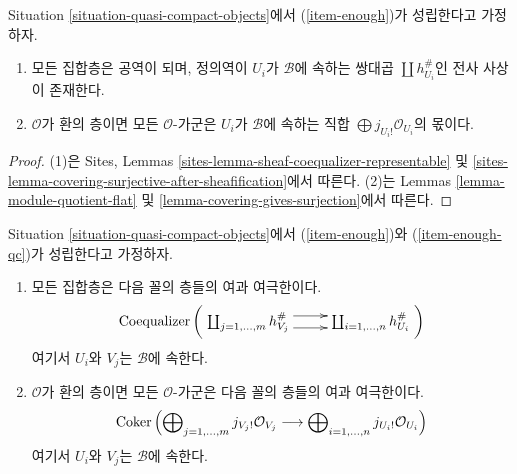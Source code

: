 \begin{lemma}
\label{lemma-module-quotient-direct-sum}
Situation \ref{situation-quasi-compact-objects}에서
(\ref{item-enough})가 성립한다고 가정하자.
\begin{enumerate}
\item 모든 집합층은 공역이 되며, 정의역이 $U_i$가 $\mathcal{B}$에 속하는
쌍대곱 $\coprod h_{U_i}^\#$인 전사 사상이 존재한다.
\item $\mathcal{O}$가 환의 층이면 모든 $\mathcal{O}$-가군은 $U_i$가
$\mathcal{B}$에 속하는 직합 $\bigoplus\nolimits j_{U_i!}\mathcal{O}_{U_i}$의
몫이다.
\end{enumerate}
\end{lemma}

\begin{proof}
(1)은 Sites, Lemmas
\ref{sites-lemma-sheaf-coequalizer-representable} 및
\ref{sites-lemma-covering-surjective-after-sheafification}에서 따른다.
(2)는 Lemmas \ref{lemma-module-quotient-flat} 및
\ref{lemma-covering-gives-surjection}에서 따른다.
\end{proof}

\begin{lemma}
\label{lemma-module-filtered-colimit-constructibles}
Situation \ref{situation-quasi-compact-objects}에서
(\ref{item-enough})와 (\ref{item-enough-qc})가 성립한다고 가정하자.
\begin{enumerate}
\item 모든 집합층은 다음 꼴의 층들의 여과 여극한이다.
\begin{equation}
\label{equation-towards-constructible-sets}
\text{Coequalizer}\left(
\xymatrix{
\coprod\nolimits_{j = 1, \ldots, m} h_{V_j}^\#
\ar@<1ex>[r] \ar@<-1ex>[r] &
\coprod\nolimits_{i = 1, \ldots, n} h_{U_i}^\#
}
\right)
\end{equation}
여기서 $U_i$와 $V_j$는 $\mathcal{B}$에 속한다.
\item $\mathcal{O}$가 환의 층이면 모든 $\mathcal{O}$-가군은 다음 꼴의
층들의 여과 여극한이다.
\begin{equation}
\label{equation-towards-constructible}
\mathop{\mathrm{Coker}}\left(
\bigoplus\nolimits_{j = 1, \ldots, m} j_{V_j!}\mathcal{O}_{V_j}
\longrightarrow
\bigoplus\nolimits_{i = 1, \ldots, n} j_{U_i!}\mathcal{O}_{U_i}
\right)
\end{equation}
여기서 $U_i$와 $V_j$는 $\mathcal{B}$에 속한다.
\end{enumerate}
\end{lemma}

